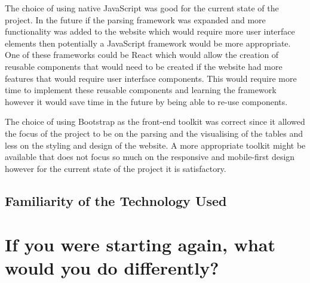 The choice of using native JavaScript was good for the current state of the project. In the future if the parsing framework was expanded and more functionality was added to the website which would require more user interface elements then potentially a JavaScript framework would be more appropriate. One of these frameworks could be React which would allow the creation of reusable components that would need to be created if the website had more features that would require user interface components. This would require more time to implement these reusable components and learning the framework however it would save time in the future by being able to re-use components. 

The choice of using Bootstrap as the front-end toolkit was correct since it allowed the focus of the project to be on the parsing and the visualising of the tables and less on the styling and design of the website. A more appropriate toolkit might be available that does not focus so much on the responsive and mobile-first design however for the current state of the project it is satisfactory. 

\subsection{Familiarity of the Technology Used}






\section{If you were starting again, what would you do differently?}


